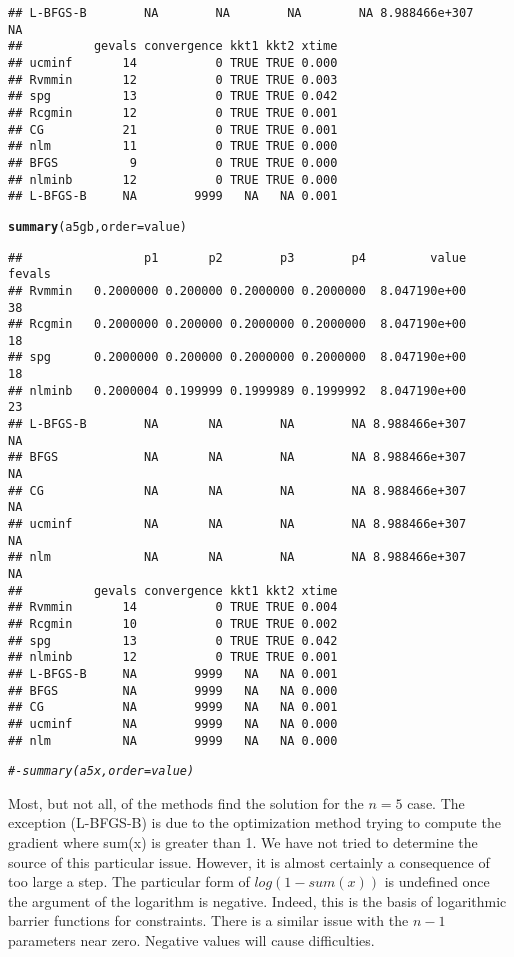 \documentclass[11pt]{article}\usepackage[]{graphicx}\usepackage[]{color}
\makeatletter
\newcommand{\hlcom}[1]{\textcolor[rgb]{0.678,0.584,0.686}{\textit{#1}}}%
\newcommand{\hlstd}[1]{\textcolor[rgb]{0.345,0.345,0.345}{#1}}%
\newcommand{\hlkwc}[1]{\textcolor[rgb]{0.333,0.667,0.333}{#1}}%
\newcommand{\hlkwd}[1]{\textcolor[rgb]{0.737,0.353,0.396}{\textbf{#1}}}%
\newenvironment{kframe}{%
 \def\at@end@of@kframe{}%
 \ifinner\ifhmode%
  \def\at@end@of@kframe{\end{minipage}}%
  \begin{minipage}{\columnwidth}%
 \fi\fi%
 \def\FrameCommand##1{\hskip\@totalleftmargin \hskip-\fboxsep
 \colorbox{shadecolor}{##1}\hskip-\fboxsep
     \hskip-\linewidth \hskip-\@totalleftmargin \hskip\columnwidth}%
 \MakeFramed {\advance\hsize-\width
   \@totalleftmargin\z@ \linewidth\hsize
   \@setminipage}}%
 {\par\unskip\endMakeFramed%
 \at@end@of@kframe}
\newenvironment{knitrout}{}{} %
\makeatother
\begin{document}
\begin{knitrout}
\begin{kframe}
\begin{verbatim}
## L-BFGS-B        NA        NA        NA        NA 8.988466e+307     NA
##          gevals convergence kkt1 kkt2 xtime
## ucminf       14           0 TRUE TRUE 0.000
## Rvmmin       12           0 TRUE TRUE 0.003
## spg          13           0 TRUE TRUE 0.042
## Rcgmin       12           0 TRUE TRUE 0.001
## CG           21           0 TRUE TRUE 0.001
## nlm          11           0 TRUE TRUE 0.000
## BFGS          9           0 TRUE TRUE 0.000
## nlminb       12           0 TRUE TRUE 0.000
## L-BFGS-B     NA        9999   NA   NA 0.001
\end{verbatim}
\begin{alltt}
\hlkwd{summary}\hlstd{(a5gb,}\hlkwc{order}\hlstd{=value)}
\end{alltt}
\begin{verbatim}
##                 p1       p2        p3        p4         value fevals
## Rvmmin   0.2000000 0.200000 0.2000000 0.2000000  8.047190e+00     38
## Rcgmin   0.2000000 0.200000 0.2000000 0.2000000  8.047190e+00     18
## spg      0.2000000 0.200000 0.2000000 0.2000000  8.047190e+00     18
## nlminb   0.2000004 0.199999 0.1999989 0.1999992  8.047190e+00     23
## L-BFGS-B        NA       NA        NA        NA 8.988466e+307     NA
## BFGS            NA       NA        NA        NA 8.988466e+307     NA
## CG              NA       NA        NA        NA 8.988466e+307     NA
## ucminf          NA       NA        NA        NA 8.988466e+307     NA
## nlm             NA       NA        NA        NA 8.988466e+307     NA
##          gevals convergence kkt1 kkt2 xtime
## Rvmmin       14           0 TRUE TRUE 0.004
## Rcgmin       10           0 TRUE TRUE 0.002
## spg          13           0 TRUE TRUE 0.042
## nlminb       12           0 TRUE TRUE 0.001
## L-BFGS-B     NA        9999   NA   NA 0.001
## BFGS         NA        9999   NA   NA 0.000
## CG           NA        9999   NA   NA 0.001
## ucminf       NA        9999   NA   NA 0.000
## nlm          NA        9999   NA   NA 0.000
\end{verbatim}
\begin{alltt}
\hlcom{#- summary(a5x,order=value)}
\end{alltt}
\end{kframe}
\end{knitrout}

Most, but not all, of the methods find the solution for the $n=5$ case. The exception (L-BFGS-B) is 
due to the optimization method trying to compute the gradient where sum(x) is greater than 1. We 
have not tried to determine the source of this particular issue. However, it is almost certainly 
a consequence of too large a step. The particular form of $log(1-sum(x))$ 
is undefined once the argument of
the logarithm is negative. Indeed, this is the basis of 
logarithmic barrier functions for constraints. There
is a similar issue with the $n-1$ parameters near zero. Negative values will cause difficulties. 
\end{document}
